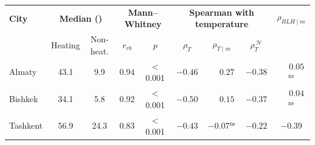 \begin{tabular}{@{}lcccccccc@{}}
\toprule
\textbf{City} & \multicolumn{2}{c}{\textbf{Median (\ugm{})}} & \multicolumn{2}{c}{\textbf{Mann--Whitney}} & \multicolumn{3}{c}{\textbf{Spearman with temperature}} & $\rho_{BLH\mid m}$ \\
 & Heating & Non-heat. & $r_{rb}$ & $p$ & $\rho_T$ & $\rho_{T\mid m}$ & $\rho_{T}^{\,\mathcal{H}}$ &  \\
\midrule
Almaty & 43.1 & 9.9 & 0.94 & $<$0.001 & $-0.46$ & $\phantom{-}0.27$ & $-0.38$ & $\phantom{-}0.05$$^{\mathrm{ns}}$ \\
Bishkek & 34.1 & 5.8 & 0.92 & $<$0.001 & $-0.50$ & $\phantom{-}0.15$ & $-0.37$ & $\phantom{-}0.04$$^{\mathrm{ns}}$ \\
Tashkent & 56.9 & 24.3 & 0.83 & $<$0.001 & $-0.43$ & $-0.07$$^{\mathrm{ns}}$ & $-0.22$ & $-0.39$ \\
\bottomrule
\end{tabular}
